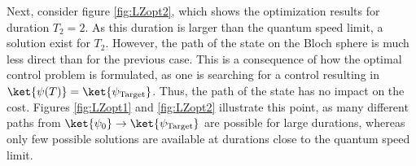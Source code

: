 Next, consider figure \ref{fig:LZopt2}, which shows the optimization results for duration $T_2 =  2$. As this duration is larger than the quantum speed limit, a solution exist for $T_2$. However, the path of the state on the Bloch sphere is much less direct than for the previous case. This is a consequence of how the optimal control problem is formulated, as one is searching for a control resulting in $\ket{\psi (T)} = \ket{\psi _{\mathrm{Target}}}$. Thus, the path of the state has no impact on the cost. Figures \ref{fig:LZopt1} and \ref{fig:LZopt2} illustrate this point, as many different paths from $\ket{\psi _0} \to \ket{\psi _{\mathrm{Target}}}$ are possible for large durations, whereas only few possible solutions are available at durations close to the quantum speed limit.